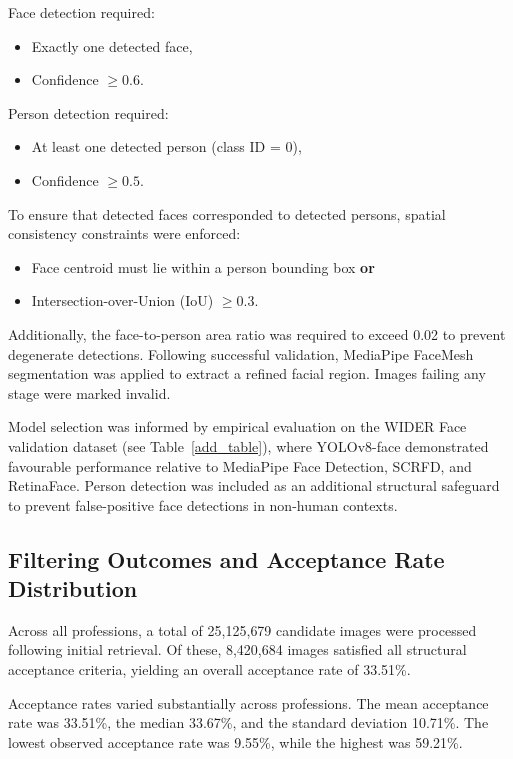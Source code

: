 Face detection required:
\begin{itemize}
	\item Exactly one detected face,
	\item Confidence $\geq 0.6$.
\end{itemize}

Person detection required:
\begin{itemize}
	\item At least one detected person (class ID = 0),
	\item Confidence $\geq 0.5$.
\end{itemize}

To ensure that detected faces corresponded to detected persons, spatial consistency constraints were enforced:
\begin{itemize}
	\item Face centroid must lie within a person bounding box \textbf{or}
	\item Intersection-over-Union (IoU) $\geq 0.3$.
\end{itemize}

Additionally, the face-to-person area ratio was required to exceed 0.02 to prevent degenerate detections. Following successful validation, MediaPipe FaceMesh segmentation was applied to extract a refined facial region. Images failing any stage were marked invalid.

Model selection was informed by empirical evaluation on the WIDER Face validation dataset (see Table~\ref{add_table}), where YOLOv8-face demonstrated favourable performance relative to MediaPipe Face Detection, SCRFD, and RetinaFace. Person detection was included as an additional structural safeguard to prevent false-positive face detections in non-human contexts.

\subsection{Filtering Outcomes and Acceptance Rate Distribution}

Across all professions, a total of 25{,}125{,}679 candidate images were processed following initial retrieval. Of these, 8{,}420{,}684 images satisfied all structural acceptance criteria, yielding an overall acceptance rate of 33.51\%.

Acceptance rates varied substantially across professions. The mean acceptance rate was 33.51\%, the median 33.67\%, and the standard deviation 10.71\%. The lowest observed acceptance rate was 9.55\%, while the highest was 59.21\%.

